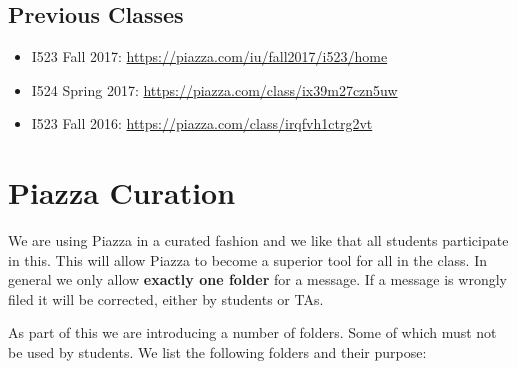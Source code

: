 \subsection{Previous Classes}

\begin{itemize}
\item  I523 Fall 2017:   \url{https://piazza.com/iu/fall2017/i523/home}
\item  I524 Spring 2017: \url{https://piazza.com/class/ix39m27czn5uw}
\item I523 Fall 2016:    \url{https://piazza.com/class/irqfvh1ctrg2vt}
\end{itemize}


\section{Piazza Curation}

We are using Piazza in a curated fashion and we like that all students
participate in this. This will allow Piazza to become a superior tool
for all in the class. In general we only allow \textbf{exactly one
folder} for a message. If a message is wrongly filed it will be
corrected, either by students or TAs.

As part of this we are introducing a number of folders. Some of which must
not be used by students. We list the following folders and their
purpose:

